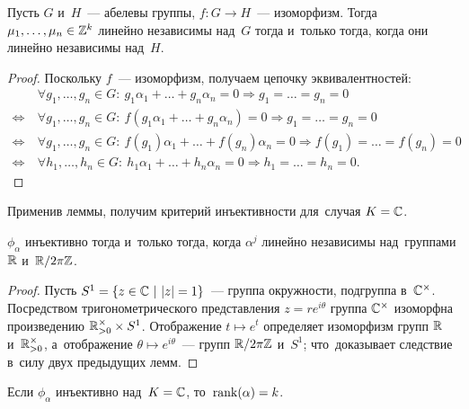 \documentclass[a4paper,oneside]{article}
\begin{document}
\begin{lemma}
    Пусть $G$ и~$H$~— абелевы группы, $f : G \rightarrow H$~— изоморфизм. Тогда $\mu_1, \ldots, \mu_n \in \mathbb{Z}^k$
    линейно независимы над~$G$ тогда и~только тогда, когда они линейно независимы над~$H$.
\end{lemma}

\begin{proof}
    Поскольку $f$~— изоморфизм, получаем цепочку эквивалентностей:
    \begin{align*}
                       &\ \forall g_1, \ldots, g_n \in G{:}\ g_1 \alpha_1 + \ldots + g_n \alpha_n = 0 \Rightarrow g_1 = \ldots = g_n = 0 \\
        \Leftrightarrow&\ \forall g_1, \ldots, g_n \in G{:}\ f(g_1 \alpha_1 + \ldots + g_n \alpha_n) = 0 \Rightarrow g_1 = \ldots = g_n = 0 \\
        \Leftrightarrow&\ \forall g_1, \ldots, g_n \in G{:}\ f(g_1) \alpha_1 + \ldots + f(g_n) \alpha_n = 0 \Rightarrow f(g_1) = \ldots = f(g_n) = 0 \\
        \Leftrightarrow&\ \forall h_1, \ldots, h_n \in G{:}\ h_1 \alpha_1 + \ldots + h_n \alpha_n = 0 \Rightarrow h_1 = \ldots = h_n = 0.
    \end{align*}
\end{proof}

Применив леммы, получим критерий инъективности для~случая $K = \mathbb{C}$.

\begin{consequence*}
    $\phi_\alpha$ инъективно тогда и~только тогда, когда $\alpha^j$ линейно независимы над~группами $\mathbb{R}$ и~$\mathbb{R} / 2 \pi \mathbb{Z}$.
\end{consequence*}

\begin{proof}
    Пусть $S^1 = \{ z \in \mathbb{C}\ | \ |z| = 1 \}$~— группа окружности, подгруппа в~$\mathbb{C}^\times$.
    Посредством тригонометрического представления $z = re^{i \theta}$ группа $\mathbb{C}^\times$
    изоморфна произведению $\mathbb{R}_{> 0}^\times \times S^1$. Отображение $t \mapsto e^t$ определяет
    изоморфизм групп $\mathbb{R}$ и~$\mathbb{R}_{> 0}^\times$, а~отображение $\theta \mapsto e^{i\theta}$~— групп $\mathbb{R} / 2 \pi \mathbb{Z}$ и~$S^1$;
    что~доказывает следствие в~силу двух предыдущих лемм.
\end{proof}

\begin{consequence*}
    Если $\phi_\alpha$ инъективно над~$K = \mathbb{C}$, то~$\mathrm{rank}(\alpha) = k$.
\end{consequence*}
\end{document}
